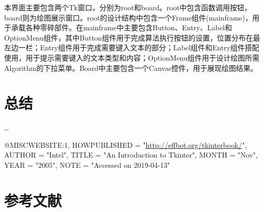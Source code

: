 \documentclass[a4paper,UTF8]{article}
\theoremstyle{definition}
\begin{document}
本界面主要包含两个Tk窗口，分别为root和board。root中包含函数调用按钮，board则为绘图展示窗口。root的设计结构中包含一个Frame组件(mainframe)，用于承载各种零碎部件。在mainframe中主要包含Button、Entry、Label和OptionMenu组件，其中Button组件用于完成算法执行按钮的设置，位置分布在最左边一栏；Entry组件用于完成需要键入文本的部分；Label组件和Entry组件搭配使用，用于提示需要键入的文本类型和内容；OptionMenu组件用于设计绘图所需Algorithm的下拉菜单。Board中主要包含一个Canvas控件，用于展现绘图结果\cite{1}。

\section{总结}
\dots

@MISC{WEBSITE:1,
	HOWPUBLISHED = "\url{http://effbot.org/tkinterbook/}",
	AUTHOR = "Intel",
	TITLE = "An Introduction to Tkinter",
	MONTH = "Nov",
	YEAR = "2005",
	NOTE = "Accessed on 2019-04-13"
}
\section{参考文献}

	
	
	
	
\end{document}
